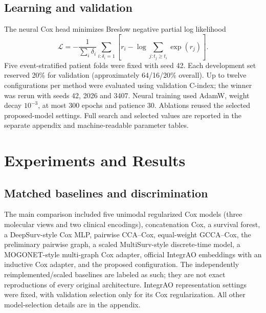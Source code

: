 \documentclass{article}
\begin{document}
\subsection{Learning and validation}
The neural Cox head minimizes Breslow negative partial log likelihood
\begin{equation}
\mathcal L=-\frac{1}{\sum_i\delta_i}\sum_{i:\delta_i=1}
\left[r_i-\log\sum_{j:t_j\geq t_i}\exp(r_j)\right].
\end{equation}
Five event-stratified patient folds were fixed with seed 42. Each development
set reserved 20\% for validation (approximately 64/16/20\% overall). Up to
twelve configurations per method were evaluated using validation C-index;
the winner was rerun with seeds 42, 2026 and 3407. Neural training used AdamW,
weight decay $10^{-3}$, at most 300 epochs and patience 30. Ablations reused
the selected proposed-model settings. Full search and selected values are
reported in the separate appendix and machine-readable parameter tables.
\clearpage
\section{Experiments and Results}
\subsection{Matched baselines and discrimination}
The main comparison included five unimodal regularized Cox models
(three molecular views and two clinical encodings),
concatenation Cox, a survival forest, a DeepSurv-style Cox MLP, pairwise
CCA--Cox, equal-weight GCCA--Cox, the preliminary pairwise graph, a scaled
MultiSurv-style discrete-time model, a MOGONET-style multi-graph Cox adapter,
official IntegrAO embeddings with an inductive Cox adapter, and the proposed
configuration. The independently reimplemented/scaled baselines are labeled
as such; they are not exact reproductions of every original architecture.
IntegrAO representation settings were fixed, with validation selection only
for its Cox regularization. All other model-selection details are in the appendix.
\end{document}
